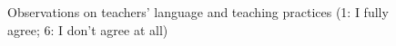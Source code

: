 \documentclass[output=paper]{../langscibook}
\begin{document}
%
%
\begin{figure}
\caption{Observations on teachers’ language and teaching practices (1: I fully agree; 6: I don’t agree at all)\label{fig:9:1}}


\end{figure}
\end{document}
